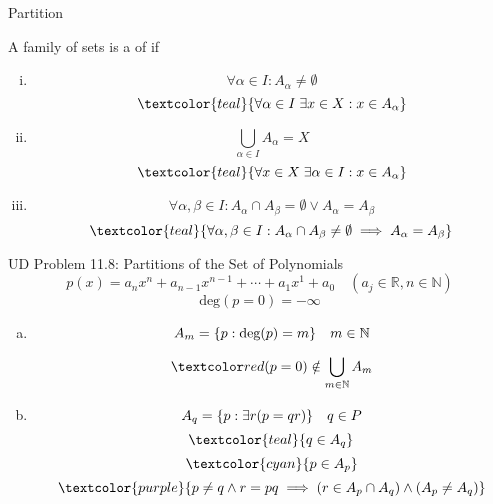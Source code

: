 \begin{frame}{}
  \begin{center}
    {\LARGE Partition}
  \end{center}

\end{frame}

\begin{frame}{}
  \begin{definition}[Partition]
    A family of sets  is a  of  if

    \begin{enumerate}[(i)]
      \item 
	\[
	  \forall \alpha \in I: A_{\alpha} \neq \emptyset
	\]
	\[
	  \textcolor{teal}{\forall \alpha \in I \; \exists x \in X: x \in A_{\alpha}}
	\]
      \item 
	\[
	  \bigcup_{\alpha \in I} A_{\alpha} = X
	\]
	\[
	  \textcolor{teal}{\forall x \in X \; \exists \alpha \in I: x \in A_{\alpha}}
	\]
      \item 
	\[
	  \forall \alpha, \beta \in I: A_{\alpha} \cap A_{\beta} = \emptyset \lor A_{\alpha} = A_{\beta}
	\]
	\[
	  \textcolor{teal}{\forall \alpha, \beta \in I: A_{\alpha} \cap A_{\beta} \neq \emptyset \implies A_{\alpha} = A_{\beta}}
	\]
    \end{enumerate}
  \end{definition}
\end{frame}

\begin{frame}{}
  \begin{exampleblock}{UD Problem 11.8: Partitions of the Set of Polynomials}
    \[
      p(x) = a_n x^n + a_{n-1} x^{n-1} + \cdots + a_1 x^1 + a_0 \quad (a_j \in \mathbb{R}, n \in \mathbb{N})
    \]
    \[
      \text{deg}(p = 0) = -\infty
    \]

    \begin{enumerate}[(a)]
      \item
	\[
	  A_m = \{p: \text{deg}(p) = m\} \quad m \in \mathbb{N}
	\]

	\pause
	\[
	  \red{(p = 0) \notin \bigcup\limits_{m \in \mathbb{N}} A_m}
	\]
      \setcounter{enumi}{2}
      \item 
	\pause
	\[
	  A_q = \{p: \exists r (p = qr)\} \quad q \in P
	\]
	\pause
	\vspace{-0.30cm}
	\[
	  \textcolor{teal}{q \in A_q}
	\]
	\pause
	\vspace{-0.50cm}
	\[
	  \textcolor{cyan}{p \in A_p}
	\]
	\pause
	\vspace{-0.50cm}
	\[
	  \textcolor{purple}{p \neq q \land r = pq \implies (r \in A_p \cap A_q) \land (A_p \neq A_q)}
	\]
    \end{enumerate}
  \end{exampleblock}
\end{frame}


